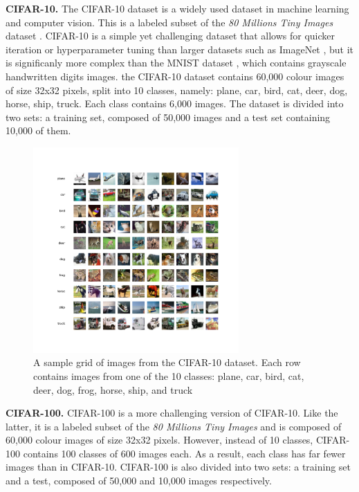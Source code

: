 \noindent\textbf{CIFAR-10.} The CIFAR-10 dataset \cite{CIFARdataset} is a widely
used dataset in machine learning and computer vision. This is a labeled subset
of the \emph{80 Millions Tiny Images} dataset \cite{4531741}. CIFAR-10 is a
simple yet challenging dataset that allows for quicker iteration or
hyperparameter tuning than larger datasets such as ImageNet
\cite{DBLP:journals/ijcv/RussakovskyDSKS15}, but it is significanly more complex
than the MNIST dataset \cite{6296535}, which contains grayscale handwritten
digits images. the CIFAR-10 dataset contains 60,000 colour images of size 32x32
pixels, split into 10 classes, namely: plane, car, bird, cat, deer, dog, horse,
ship, truck. Each class contains 6,000 images. The dataset is divided into two
sets: a training set, composed of 50,000 images and a test set containing 10,000
of them.\\

\begin{figure}[ht!]
    \centering
    \includegraphics[width=0.7\textwidth]{chapter_intro/assets/cifar-10_example.png}
    \caption{ A sample grid of images from the CIFAR-10 dataset. Each row
    contains images from one of the 10 classes: plane, car, bird, cat,
    deer, dog, frog, horse, ship, and truck}
    \label{fig:intro:cifar10_examples}
\end{figure}


\noindent\textbf{CIFAR-100.} CIFAR-100 \cite{CIFARdataset} is a more challenging
version of CIFAR-10. Like the latter, it is a labeled subset of the \emph{80
Millions Tiny Images} and  is composed of 60,000 colour images of size 32x32
pixels. However, instead of 10 classes, CIFAR-100 contains 100 classes of 600
images each. As a result, each class has far fewer images than in CIFAR-10.
CIFAR-100 is also divided into two sets: a training set and a test, composed of
50,000 and 10,000 images respectively.\\

